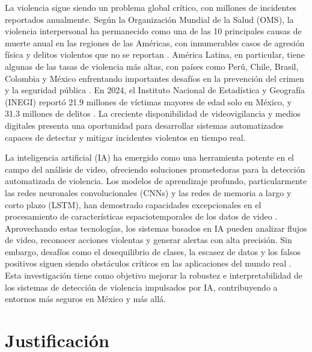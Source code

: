 La violencia sigue siendo un problema global crítico, con millones 
de incidentes reportados anualmente. Según la Organización Mundial 
de la Salud (OMS), la violencia interpersonal ha permanecido como 
una de las 10 principales causas de muerte anual en las regiones 
de las Américas, con innumerables casos de agresión física y 
delitos violentos que no se reportan \cite{WorldHealthOrganization2024}. 
América Latina, en particular, tiene algunas de las tasas de violencia 
más altas, con países como Perú, Chile, Brasil, Colombia y México 
enfrentando importantes desafíos en la prevención del crimen y 
la seguridad pública \cite{Bisca2024}. En 2024, el Instituto Nacional 
de Estadística y Geografía (INEGI) reportó 21.9 millones de víctimas 
mayores de edad solo en México, y 31.3 millones de delitos \cite{INEGI2024}. 
La creciente disponibilidad de videovigilancia y medios digitales 
presenta una oportunidad para desarrollar sistemas automatizados 
capaces de detectar y mitigar incidentes violentos en tiempo real.

La inteligencia artificial (IA) ha emergido como una herramienta 
potente en el campo del análisis de video, ofreciendo soluciones 
prometedoras para la detección automatizada de violencia. Los modelos 
de aprendizaje profundo, particularmente las redes neuronales 
convolucionales (CNNs) y las redes de memoria a largo y corto plazo 
(LSTM), han demostrado capacidades excepcionales en el procesamiento 
de características espaciotemporales de los datos de video \cite{Orozco2021}. 
Aprovechando estas tecnologías, los sistemas basados en IA pueden 
analizar flujos de video, reconocer acciones violentas y generar alertas 
con alta precisión. Sin embargo, desafíos como el desequilibrio de clases, 
la escasez de datos y los falsos positivos siguen siendo obstáculos 
críticos en las aplicaciones del mundo real \cite{Kulkarni2021}. Esta 
investigación tiene como objetivo mejorar la robustez e interpretabilidad 
de los sistemas de detección de violencia impulsados por IA, contribuyendo 
a entornos más seguros en México y más allá.

\section{Justificación}


